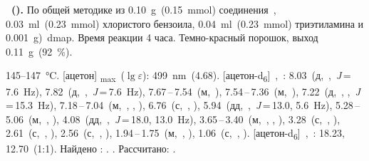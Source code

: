 \textbf{~().} 
По общей методике из \SI{0.10}{\gram}~(\SI{0.15}{\milli\mole}) соединения~, \SI{0.03}{\milli\litre}~(\SI{0.23}{\milli\mole}) хлористого бензоила, \SI{0.04}{\milli\litre}~(\SI{0.23}{\milli\mole}) триэтиламина и \SI{0.001}{\gram})~\ac{dmap}.
Время реакции 4 часа.
Темно-красный порошок, выход \SI{0.11}{\gram}~(\SI{92}{\percent}).
\begin{experimental}
     145--\SI{147}{\celsius}.
    [ацетон] \chemlambda\textsubscript{max}~($\lg \varepsilon$): \SI{499}{\nano\metre}~(4.68).
    [ацетон-d\textsubscript{6}]~\chemdelta,~\si{\ppm}: 8.03~(д,~,~\textit{J}\,=\,7.6~\si{\hertz}), 7.82~(д,~,~\textit{J}\,=\,7.6~\si{\hertz}), 7.67\,--\,7.54~(м,~), 7.54\,--\,7.36~(м,~), 7.22~(д,~, ,~\textit{J}\,=\,15.3~\si{\hertz}), 7.18\,--\,7.04~(м,~, , ), 6.76~(с,~, ), 5.94~(дд,~,~\textit{J}\,=\,13.0, 5.6~\si{\hertz}), 5.28\,--\,5.06~(м,~, ), 4.08~(дд,~,~\textit{J}\,=\,18.0, 13.0~\si{\hertz}), 3.65\,--\,3.40~(м,~, , ), 3.28~(с,~, ), 2.61~(с,~, ), 2.56~(с,~, ), 1.94\,--\,1.75~(м,~, ), 1.06~(с,~, ).
    [ацетон-d\textsubscript{6}]~\chemdelta,~\si{\ppm}: 18.23, 12.70~(1:1).
     Найдено \ce{[M+]}: \num{}. . Рассчитано:  \num{}. 
\end{experimental}

